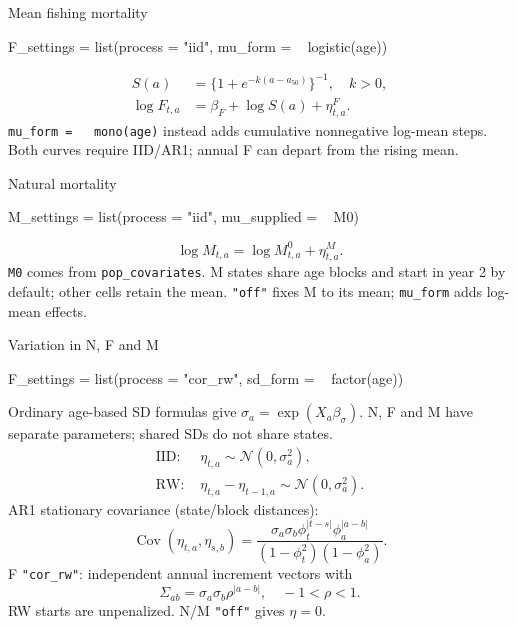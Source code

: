 \documentclass[
  9pt,
  landscape]{extarticle}
\newcommand{\micro}[1]{{\fontsize{7.0}{9.0}\selectfont #1}}
\begin{document}
\begin{minipage}[t]{.325\linewidth}\vspace{0pt}
\begin{mathbox}{Mean fishing mortality}
\begin{rcode}
F_settings = list(process = "iid",
  mu_form = ~ logistic(age))
\end{rcode}
\[
\begin{aligned}
S(a)&=\{1+e^{-k(a-a_{50})}\}^{-1},\quad k>0,\\
\log F_{t,a}&=\beta_F+\log S(a)+\eta^F_{t,a}.
\end{aligned}
\]
\micro{\texttt{mu\_form = \string~ mono(age)} instead adds cumulative nonnegative log-mean steps. Both curves require IID/AR1; annual F can depart from the rising mean.}
\end{mathbox}\vspace{2mm}
\begin{mathbox}{Natural mortality}
\begin{rcode}
M_settings = list(process = "iid",
  mu_supplied = ~ M0)
\end{rcode}
\[
\log M_{t,a}=\log M^0_{t,a}+\eta^M_{t,a}.
\]
\micro{\texttt{M0} comes from \texttt{pop\_covariates}. M states share age blocks and start in year 2 by default; other cells retain the mean. \texttt{"off"} fixes M to its mean; \texttt{mu\_form} adds log-mean effects.}
\end{mathbox}\vspace{2mm}
\begin{mathbox}{Variation in N, F and M}
\begin{rcode}
F_settings = list(process = "cor_rw",
  sd_form = ~ factor(age))
\end{rcode}
\micro{Ordinary age-based SD formulas give $\sigma_a=\exp(X_a\beta_\sigma)$. N, F and M have separate parameters; shared SDs do not share states.}
\[
\begin{aligned}
\text{IID: }&\eta_{t,a}\sim\mathcal N(0,\sigma_a^2),\\
\text{RW: }&\eta_{t,a}-\eta_{t-1,a}\sim\mathcal N(0,\sigma_a^2).
\end{aligned}
\]
\micro{AR1 stationary covariance (state/block distances):}
\[
\operatorname{Cov}(\eta_{t,a},\eta_{s,b})=
\frac{\sigma_a\sigma_b\phi_t^{|t-s|}\phi_a^{|a-b|}}
{(1-\phi_t^2)(1-\phi_a^2)}.
\]
\micro{F \texttt{"cor\_rw"}: independent annual increment vectors with}
\[
\Sigma_{ab}=\sigma_a\sigma_b\rho^{|a-b|},\quad-1<\rho<1.
\]
\micro{RW starts are unpenalized. N/M \texttt{"off"} gives $\eta=0$.}
\end{mathbox}
\end{minipage}\hfill
\end{document}
